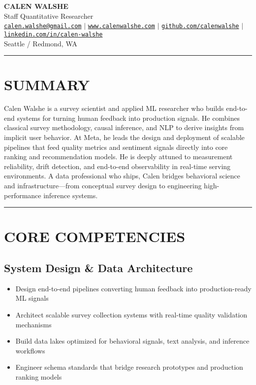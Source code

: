\documentclass[11pt,a4paper]{article}
\newcommand{\sepline}{\noindent\rule{\textwidth}{0.5pt}\vspace{0.5em}}
\begin{document}
\begin{center}
    {\Huge\bfseries\color{darkblue} CALEN WALSHE}\\[0.3em]
    {\large Staff Quantitative Researcher}\\[0.5em]

    \href{mailto:calen.walshe@gmail.com}{\texttt{calen.walshe@gmail.com}} $\mid$
    \href{https://www.calenwalshe.com}{\texttt{www.calenwalshe.com}} $\mid$
    \href{https://github.com/calenwalshe}{\texttt{github.com/calenwalshe}} $\mid$
    \href{https://www.linkedin.com/in/calen-walshe}{\texttt{linkedin.com/in/calen-walshe}}\\[0.2em]

    {\color{mediumgray} Seattle / Redmond, WA}
\end{center}

\vspace{0.5em}
\sepline

\section*{SUMMARY}
Calen Walshe is a survey scientist and applied ML researcher who builds end-to-end systems for turning human feedback into production signals. He combines classical survey methodology, causal inference, and NLP to derive insights from implicit user behavior. At Meta, he leads the design and deployment of scalable pipelines that feed quality metrics and sentiment signals directly into core ranking and recommendation models. He is deeply attuned to measurement reliability, drift detection, and end-to-end observability in real-time serving environments. A data professional who ships, Calen bridges behavioral science and infrastructure—from conceptual survey design to engineering high-performance inference systems.

\vspace{0.5em}
\sepline

\section*{CORE COMPETENCIES}

\subsection*{System Design \& Data Architecture}
\begin{itemize}
    \item Design end-to-end pipelines converting human feedback into production-ready ML signals
    \item Architect scalable survey collection systems with real-time quality validation mechanisms
    \item Build data lakes optimized for behavioral signals, text analysis, and inference workflows
    \item Engineer schema standards that bridge research prototypes and production ranking models
\end{itemize}
\end{document}
